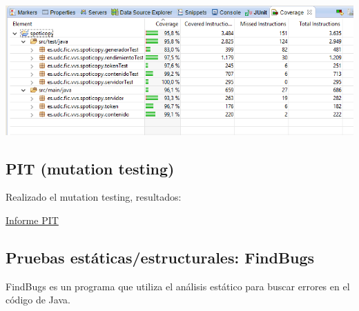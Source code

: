 \documentclass[12pt, a4paper, titlepage]{article}
\begin{document}
	\includegraphics[width=15cm]{Imagenes/Covertura3.png} \\
	\subsection{PIT (mutation testing)}
	
	Realizado el mutation testing, resultados:
	
	\href{Informes/PIT1/index.html}{Informe PIT} \\
	
	\subsection{Pruebas estáticas/estructurales: FindBugs}
	
	FindBugs es un programa que utiliza el análisis estático para buscar errores en el código de Java.
	
\end{document}
